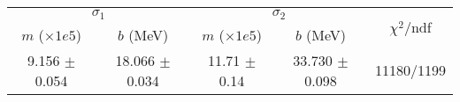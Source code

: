 \begin{tabular}{cc|cc||c}
\multicolumn{2}{c|}{$\sigma_1$} & \multicolumn{2}{|c}{$\sigma_2$} & \multirow{2}{*}{$\chi^2/$ndf} \\
$m$ ($\times1e5$) & $b$ (MeV) & $m$ ($\times1e5$) & $b$ (MeV) & \\
\hline
9.156 $\pm$ 0.054 & 18.066 $\pm$ 0.034 & 11.71 $\pm$ 0.14 & 33.730 $\pm$ 0.098 & 11180/1199\\
\end{tabular}
